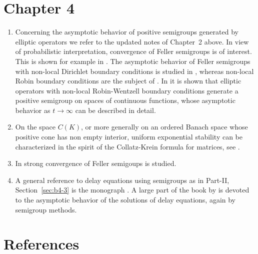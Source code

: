 \section*{Chapter 4}
\begin{enumerate}
\item 
Concerning the asymptotic behavior of positive semigroups generated by elliptic operators we refer to the updated notes of Chapter~2 above. 
In view of probabilistic interpretation, convergence of Feller semigroups is of interest. 
This is shown for example in \textcite{zbmath07694938}.
The asymptotic behavior of Feller semigroups with non-local Dirichlet boundary conditions is studied in \textcite{zbmath06548310}, whereas non-local Robin boundary conditions are the subject of 
\textcite{zbmath07009711}. 
In \textcite{arXiv:2502.03216} it is shown that elliptic operators with non-local Robin-Wentzell boundary conditions generate a positive semigroup on spaces of continuous functions, whose asymptotic behavior as $t \rightarrow \infty$ can be described in detail.

\item
On the space $C(K)$, or more generally on an ordered Banach space whose positive cone has non empty interior, uniform exponential stability can be characterized in the spirit of the  Collatz-Krein formula for matrices, see \textcite{zbmath07964911}.

\item
In \textcite{zbmath06289415} strong convergence of Feller semigoups is studied.

\item
A general reference to delay equations using semigroups as in Part-II, Section~\ref{sec:b4-3} is the monograph \textcite{zbmath00770062}. 
A large part of the book by \textcite{zbmath02215036} is devoted to the asymptotic behavior of the solutions of delay equations, again by semigroup methods.

\end{enumerate}
\section*{References}
{\RaggedRight
  \printbibliography[heading=none]
 }